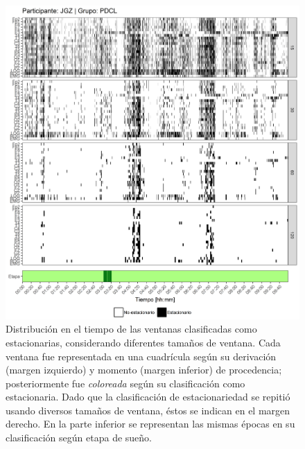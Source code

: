 \begin{figure}
\centering
\includegraphics[width=\linewidth]
{./scripts_graf_res/JGZ_patrones_2.png}
\caption[Distribución en el tiempo de las ventanas clasificadas como estacionarias, considerando diferentes tamaños de ventana]{Distribución en el tiempo de las ventanas clasificadas como estacionarias, considerando diferentes tamaños de ventana. 
Cada ventana fue representada en una cuadrícula según su derivación (margen izquierdo) y momento (margen inferior) de procedencia; posteriormente fue \textit{coloreada} según su clasificación como estacionaria.
Dado que la clasificación de estacionariedad se repitió usando diversos tamaños de ventana, éstos se indican en el margen derecho.
En la parte inferior se representan las mismas épocas en su clasificación según etapa de sueño.}
\end{figure}



